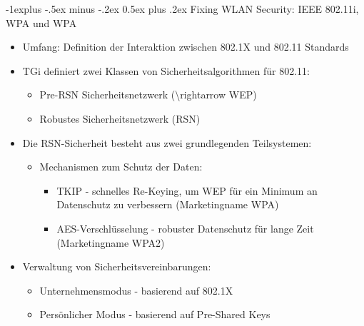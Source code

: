 \documentclass[a4paper]{article}
\makeatletter
\renewcommand{\subsection}{\@startsection{subsection}{2}{0mm}%
 {-1explus -.5ex minus -.2ex}%
 {0.5ex plus .2ex}%
 {\normalfont\normalsize\bfseries}}
\makeatother
\begin{document}
\begin{multicols}{3}
    \subsection{Fixing WLAN Security: IEEE 802.11i, WPA und
        WPA}

    \begin{itemize}
        \item
              Umfang: Definition der Interaktion zwischen 802.1X und 802.11
              Standards
        \item
              TGi definiert zwei Klassen von Sicherheitsalgorithmen für 802.11:

              \begin{itemize}
                  \item
                        Pre-RSN Sicherheitsnetzwerk (\textbackslash rightarrow WEP)
                  \item
                        Robustes Sicherheitsnetzwerk (RSN)
              \end{itemize}
        \item
              Die RSN-Sicherheit besteht aus zwei grundlegenden Teilsystemen:

              \begin{itemize}
                  \item
                        Mechanismen zum Schutz der Daten:

                        \begin{itemize}
                            \item
                                  TKIP - schnelles Re-Keying, um WEP für ein Minimum an Datenschutz
                                  zu verbessern (Marketingname WPA)
                            \item
                                  AES-Verschlüsselung - robuster Datenschutz für lange Zeit
                                  (Marketingname WPA2)
                        \end{itemize}
              \end{itemize}
        \item
              Verwaltung von Sicherheitsvereinbarungen:

              \begin{itemize}
                  \item
                        Unternehmensmodus - basierend auf 802.1X
                  \item
                        Persönlicher Modus - basierend auf Pre-Shared Keys
              \end{itemize}
    \end{itemize}


\end{multicols}
\end{document}
